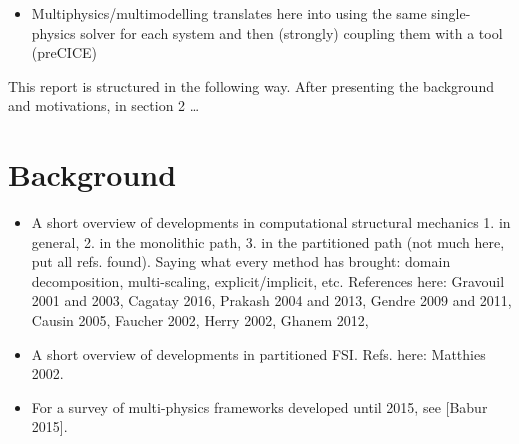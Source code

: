 \documentclass[a4paper, 11pt, oneside]{Thesis}  %
\begin{document}
\begin{itemize}


        \item Multiphysics/multimodelling translates here into using the same single-physics solver for each system and then (strongly) coupling them with a tool (preCICE)
    \end{itemize}
    
    This report is structured in the following way. After presenting the background and motivations, in section 2 \ldots
    
    \section{Background}

        \begin{itemize}
            \item A short overview of developments in computational structural mechanics 1. in general, 2. in the monolithic path, 3. in the partitioned path (not much here, put all refs. found). Saying what every method has brought: domain decomposition, multi-scaling, explicit/implicit, etc. References here: Gravouil 2001 and 2003, Cagatay 2016, Prakash 2004 and 2013, Gendre 2009 and 2011, Causin 2005, Faucher 2002, Herry 2002, Ghanem 2012,%
            \item A short overview of developments in partitioned FSI. Refs. here: Matthies 2002.
            \item For a survey of multi-physics frameworks developed until 2015, see [Babur 2015].
        \end{itemize}
\end{document}
